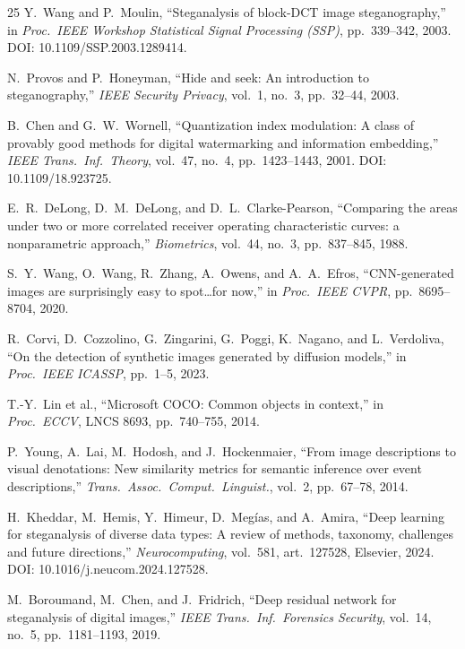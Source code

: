 \documentclass[10pt,twocolumn,a4paper]{article}
\begin{document}
\begin{thebibliography}{25}
Y.~Wang and P.~Moulin,
``Steganalysis of block-DCT image steganography,''
in \textit{Proc.\ IEEE Workshop Statistical Signal Processing (SSP)}, pp.~339--342, 2003.
DOI: 10.1109/SSP.2003.1289414.

N.~Provos and P.~Honeyman,
``Hide and seek: An introduction to steganography,''
\textit{IEEE Security Privacy}, vol.~1, no.~3, pp.~32--44, 2003.

B.~Chen and G.~W.~Wornell,
``Quantization index modulation: A class of provably good methods for digital watermarking and information embedding,''
\textit{IEEE Trans.\ Inf.\ Theory}, vol.~47, no.~4, pp.~1423--1443, 2001.
DOI: 10.1109/18.923725.

E.~R.~DeLong, D.~M.~DeLong, and D.~L.~Clarke-Pearson,
``Comparing the areas under two or more correlated receiver operating characteristic curves: a nonparametric approach,''
\textit{Biometrics}, vol.~44, no.~3, pp.~837--845, 1988.

S.~Y.~Wang, O.~Wang, R.~Zhang, A.~Owens, and A.~A.~Efros,
``CNN-generated images are surprisingly easy to spot\ldots for now,''
in \textit{Proc.\ IEEE CVPR}, pp.~8695--8704, 2020.

R.~Corvi, D.~Cozzolino, G.~Zingarini, G.~Poggi, K.~Nagano, and L.~Verdoliva,
``On the detection of synthetic images generated by diffusion models,''
in \textit{Proc.\ IEEE ICASSP}, pp.~1--5, 2023.

T.-Y.~Lin et al.,
``Microsoft COCO: Common objects in context,''
in \textit{Proc.\ ECCV}, LNCS 8693, pp.~740--755, 2014.

P.~Young, A.~Lai, M.~Hodosh, and J.~Hockenmaier,
``From image descriptions to visual denotations: New similarity metrics for semantic inference over event descriptions,''
\textit{Trans.\ Assoc.\ Comput.\ Linguist.}, vol.~2, pp.~67--78, 2014.

H.~Kheddar, M.~Hemis, Y.~Himeur, D.~Meg\'{i}as, and A.~Amira,
``Deep learning for steganalysis of diverse data types: A review of methods, taxonomy, challenges and future directions,''
\textit{Neurocomputing}, vol.~581, art.~127528, Elsevier, 2024.
DOI: 10.1016/j.neucom.2024.127528.

M.~Boroumand, M.~Chen, and J.~Fridrich,
``Deep residual network for steganalysis of digital images,''
\textit{IEEE Trans.\ Inf.\ Forensics Security}, vol.~14, no.~5, pp.~1181--1193, 2019.


\end{thebibliography}
\end{document}
